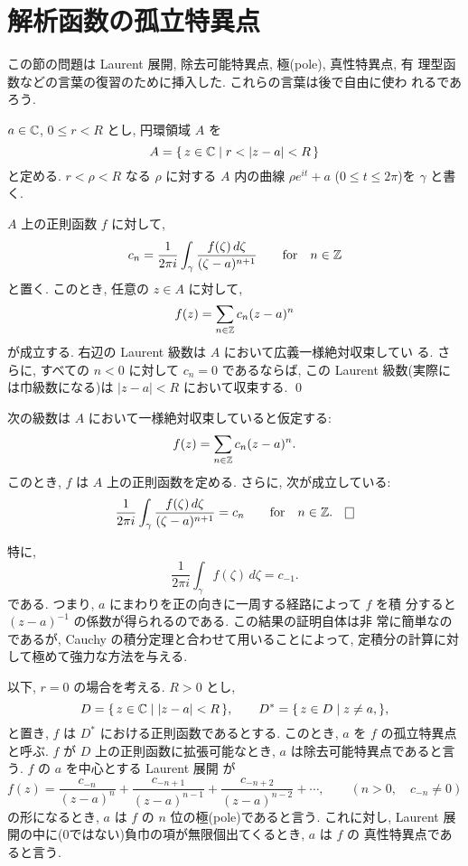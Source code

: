 \documentclass[12pt,twoside]{jarticle}
\begin{document}

\section{解析函数の孤立特異点}

この節の問題は Laurent 展開, 除去可能特異点, 極(pole), 真性特異点, 有
理型函数などの言葉の復習のために挿入した. これらの言葉は後で自由に使わ
れるであろう.

$a\in{\mathbb C}$, $0\le r<R$ とし, 円環領域 $A$ を
\[%
    A = \{\, z\in\C \mid r < |z - a| < R \,\}
\]%
と定める. $r<\rho<R$ なる $\rho$ に対する %
$A$ 内の曲線 $\rho e^{it}+a$ ($0\le t \le 2\pi$)を $\gamma$ と書く.

\begin{question}[Laurent 展開]
  $A$ 上の正則函数 $f$ に対して, 
  \[
    c_n =
    \frac{1}{2\pi i}
    \int_{\gamma} \frac{f(\zeta)\,d\zeta}{(\zeta - a)^{n+1}}
    \qquad
    \text{for}\quad n\in{\mathbb Z}
  \]%
  と置く. このとき, 任意の $z\in A$ に対して, 
  \[
    f(z) = \sum_{n\in{\mathbb Z}} c_n (z - a)^n
  \]%
  が成立する. 右辺の Laurent 級数は $A$ において広義一様絶対収束してい
  る. さらに, すべての $n<0$ に対して $c_n = 0$ であるならば, この 
  Laurent 級数(実際には巾級数になる)は $|z-a|<R$ において収束する. 
  \qed
\end{question}

\begin{question}
  次の級数は $A$ において一様絶対収束していると仮定する:
  \[
    f(z) = \sum_{n\in{\mathbb Z}} c_n (z - a)^n.
  \]%
  このとき, $f$ は $A$ 上の正則函数を定める. さらに, 次が成立している:
  \[
    \frac{1}{2\pi i}
    \int_{\gamma} \frac{f(\zeta)\,d\zeta}{(\zeta - a)^{n+1}}
    = c_n
    \qquad
    \text{for}\quad n\in\Z.
    \qed
  \]%
\end{question}

\noindent 特に, 
\[
  \frac{1}{2\pi i} \int_{\gamma} f(\zeta)\,d\zeta = c_{-1}.
\]%
である. つまり, $a$ にまわりを正の向きに一周する経路によって $f$ を積
分すると $(z-a)^{-1}$ の係数が得られるのである. この結果の証明自体は非
常に簡単なのであるが, Cauchy の積分定理と合わせて用いることによって, 
定積分の計算に対して極めて強力な方法を与える.


以下, $r=0$ の場合を考える. $R > 0$ とし, 
\[%
  D = \{\, z\in\C \mid |z - a| < R \,\},
  \qquad
  D^* = \{\, z\in D \mid z \ne a,\},
\]%
と置き, $f$ は $D^*$ における正則函数であるとする. このとき, $a$ を 
$f$ の孤立特異点と呼ぶ. $f$ が $D$ 上の正則函数に拡張可能なとき, %
$a$ は除去可能特異点であると言う. $f$ の $a$ を中心とする Laurent 展開
が
\[%
  f(z) =
  \frac{c_{-n}}{(z-a)^n}
  + \frac{c_{-n+1}}{(z-a)^{n-1}}
  + \frac{c_{-n+2}}{(z-a)^{n-2}}
  + \cdots,
  \qquad
  (n > 0, \quad c_{-n}\ne 0)
\]%
の形になるとき, $a$ は $f$ の $n$ 位の極(pole)であると言う. これに対し,
Laurent 展開の中に(0ではない)負巾の項が無限個出てくるとき, $a$ は $f$ の
真性特異点であると言う.
\end{document}
